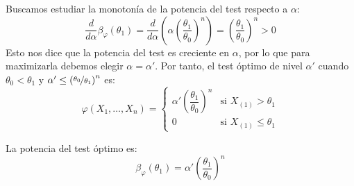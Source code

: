 \begin{ejercicio}
\begin{description}
\begin{description}
            Buscamos estudiar la monotonía de la potencia del test respecto a $\alpha$:
            \begin{equation*}
                \frac{d}{d\alpha}\beta_\varphi(\theta_1) = \frac{d}{d\alpha}\left(\alpha\left(\frac{\theta_1}{\theta_0}\right)^n\right) = \left(\frac{\theta_1}{\theta_0}\right)^n > 0
            \end{equation*}
            Esto nos dice que la potencia del test es creciente en $\alpha$, por lo que para maximizarla debemos elegir $\alpha = \alpha'$. Por tanto, el test óptimo de nivel $\alpha'$ cuando $\theta_0 < \theta_1$ y $\alpha' \leq \left(\nicefrac{\theta_0}{\theta_1}\right)^n$ es:
            \begin{equation*}
                \varphi(X_1, \ldots, X_n) = \left\{\begin{array}{ll}
                    \alpha'\left(\dfrac{\theta_1}{\theta_0}\right)^n & \text{si\ } X_{(1)} > \theta_1 \\[8pt]
                    0 & \text{si\ } X_{(1)} \leq \theta_1
                \end{array}\right.
            \end{equation*}

            La potencia del test óptimo es:
            \begin{equation*}
                \beta_\varphi(\theta_1) = \alpha'\left(\frac{\theta_1}{\theta_0}\right)^n
            \end{equation*}


\end{description}
\end{description}
\end{ejercicio}
